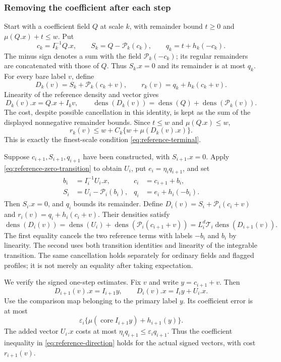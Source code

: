 \subsubsection{Removing the coefficient after each step}
Start with a coefficient field $Q$ at scale $k$, with remainder
bound $t\ge0$ and $\mu(Q.x)+t\le w$. Put
\[
 c_k=I_k^{-1}Q.x,\qquad
 S_k=Q-\mathcal P_k(c_k),\qquad
 q_k=t+h_k(-c_k).
\]
The minus sign denotes a sum with the field $\mathcal P_k(-c_k)$;
its regular remainders are concatenated with those of $Q$.
Thus $S_k.x=0$ and its remainder is at most $q_k$. For every
bare label $v$, define
\[
 D_k(v)=S_k+\mathcal P_k(c_k+v),\qquad
 r_k(v)=q_k+h_k(c_k+v).
\]
Linearity of the reference density and vector gives
\begin{equation}\label{eq:reference-top-family}
 D_k(v).x=Q.x+I_kv,
 \qquad\operatorname{dens}(D_k(v))
                  =\operatorname{dens}(Q)+\operatorname{dens}(\mathcal P_k(v)).
\end{equation}
The cost, despite possible cancellation in this identity, is
kept as the sum of the displayed nonnegative remainder bounds.
Since $t\le w$ and $\mu(Q.x)\le w$,
\[
 r_k(v)\le w+C_k\{w+\mu(D_k(v).x)\}.
\]
This is exactly the finest-scale condition
\eqref{eq:reference-terminal}.

Suppose $c_{i+1},S_{i+1},q_{i+1}$ have been constructed, with
$S_{i+1}.x=0$. Apply \eqref{eq:reference-zero-transition} to obtain
$U_i$, put $e_i=\eta_iq_{i+1}$, and set
\begin{align*}
 b_i&=I_i^{-1}U_i.x,&c_i&=c_{i+1}+b_i,\\
 S_i&=U_i-\mathcal P_i(b_i),&
 q_i&=e_i+h_i(-b_i).
\end{align*}
Then $S_i.x=0$, and $q_i$ bounds its remainder. Define
$D_i(v)=S_i+\mathcal P_i(c_i+v)$ and
$r_i(v)=q_i+h_i(c_i+v)$. Their densities satisfy
\[
 \operatorname{dens}(D_i(v))
           =\operatorname{dens}(U_i)
                       +\operatorname{dens}(\mathcal P_i(c_{i+1}+v))
           =L_i^d\mathcal T_i\operatorname{dens}(D_{i+1}(v)).
\]
The first equality cancels the two reference terms with labels
$-b_i$ and $b_i$ by linearity. The second uses both transition
identities and linearity of the integrable transition. The same
cancellation holds separately for ordinary fields and flagged
profiles; it is not merely an equality after taking expectation.

We verify the signed one-step estimates. Fix $v$ and write
$y=c_{i+1}+v$. Then
\[
 D_{i+1}(v).x=I_{i+1}y,\qquad D_i(v).x=I_i y+U_i.x.
\]
Use the comparison map belonging to the primary label $y$.
Its coefficient error is at most
\[
 \varepsilon_i\{\mu(\operatorname{core}I_{i+1}y)+h_{i+1}(y)\}.
\]
The added vector $U_i.x$ costs at most
$\eta_iq_{i+1}\le\varepsilon_iq_{i+1}$. Thus the coefficient
inequality in \eqref{eq:reference-direction} holds for the
actual signed vectors, with cost $r_{i+1}(v)$.

